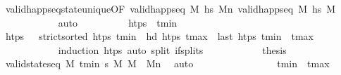 \begin{isabellebody}
\ valid{\isacharunderscore}{\kern0pt}happ{\isacharunderscore}{\kern0pt}seq{\isacharunderscore}{\kern0pt}state{\isacharunderscore}{\kern0pt}unique{\isacharbrackleft}{\kern0pt}OF\ {\isacartoucheopen}valid{\isacharunderscore}{\kern0pt}happ{\isacharunderscore}{\kern0pt}seq\ M\ hs\ M\isactrlsub n{\isacartoucheclose}\ {\isacartoucheopen}valid{\isacharunderscore}{\kern0pt}happ{\isacharunderscore}{\kern0pt}seq\ M\ hs\ M\isanewline
\ \ \ \ \ \ \ \ \ \ \isamarkupfalse%
\ auto\isanewline
\ \ \ \ \ \ \ \ \isamarkupfalse%
\ {\isachardoublequoteopen}htps\ {\isacharequal}{\kern0pt}\ {\isacharbrackleft}{\kern0pt}t\isactrlsub m\isactrlsub i\isactrlsub n{\isacharbrackright}{\kern0pt}{\isachardoublequoteclose}\isanewline
\ \ \ \ \ \ \ \ \ \ \isamarkupfalse%
\ {\isacartoucheopen}htps\ {\isasymnoteq}\ {\isacharbrackleft}{\kern0pt}{\isacharbrackright}{\kern0pt}{\isacartoucheclose}\ {\isacartoucheopen}strict{\isacharunderscore}{\kern0pt}sorted\ htps{\isacartoucheclose}\ {\isacartoucheopen}t\isactrlsub m\isactrlsub i\isactrlsub n\ {\isacharequal}{\kern0pt}\ hd\ htps{\isacartoucheclose}\ {\isacartoucheopen}t\isactrlsub m\isactrlsub a\isactrlsub x\ {\isacharequal}{\kern0pt}\ last\ htps{\isacartoucheclose}\ {\isacartoucheopen}t\isactrlsub m\isactrlsub i\isactrlsub n\ {\isacharequal}{\kern0pt}\ t\isactrlsub m\isactrlsub a\isactrlsub x{\isacartoucheclose}\isanewline
\ \ \ \ \ \ \ \ \ \ \isamarkupfalse%
\ {\isacharparenleft}{\kern0pt}induction\ htps{\isacharparenright}{\kern0pt}\ {\isacharparenleft}{\kern0pt}auto\ split{\isacharcolon}{\kern0pt}\ if{\isacharunderscore}{\kern0pt}splits{\isacharparenright}{\kern0pt}\isanewline
\ \ \ \ \ \ \ \ \isamarkupfalse%
\ \isamarkupfalse%
\ {\isacharquery}{\kern0pt}thesis\isanewline
\ \ \ \ \ \ \ \ \ \ \isamarkupfalse%
\ {\isacartoucheopen}valid{\isacharunderscore}{\kern0pt}state{\isacharunderscore}{\kern0pt}seq\ M\ {\isacharbrackleft}{\kern0pt}t\isactrlsub m\isactrlsub i\isactrlsub n{\isacharbrackright}{\kern0pt}\ {\isasympi}s\ M\ {\isacartoucheopen}M\ {\isacharequal}{\kern0pt}\ M\isactrlsub n{\isacartoucheclose}\ \isamarkupfalse%
\ auto\isanewline
\ \ \ \ \ \ \isamarkupfalse%
\isanewline
\ \ \ \ \ \ \ \ \isamarkupfalse%
\ {\isachardoublequoteopen}t\isactrlsub m\isactrlsub i\isactrlsub n\ {\isacharless}{\kern0pt}\ t\isactrlsub m\isactrlsub a\isactrlsub x{\isachardoublequoteclose}\isanewline

\end{isabellebody}
